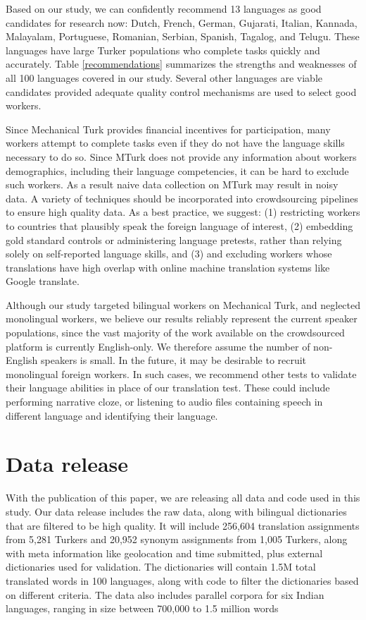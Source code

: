 \documentclass[11pt]{article}
\begin{document}
Based on our study, we can confidently recommend 13 languages as good candidates for research now: Dutch, French, German, Gujarati, Italian, Kannada, Malayalam, Portuguese, Romanian, Serbian, Spanish, Tagalog, and Telugu. These languages have large Turker populations who complete tasks quickly and accurately. Table \ref{recommendations} summarizes the strengths and weaknesses of all 100 languages covered in our study.  Several other languages are viable candidates provided adequate quality control mechanisms are used to select good workers.

Since Mechanical Turk provides financial incentives for participation, many workers attempt to complete tasks even if they do not have the language skills necessary to do so.  Since MTurk does not provide any information about workers demographics, including their language competencies, it can be hard to exclude such workers.  As a result naive data collection on MTurk may result in noisy data.  A variety of techniques should be incorporated into crowdsourcing pipelines to ensure high quality data.  As a best practice, we suggest: (1) restricting workers to countries that plausibly speak the foreign language of interest, (2) embedding gold standard controls or administering language pretests, rather than relying solely on self-reported language skills, and (3) and excluding workers whose translations have high overlap with online machine translation systems like Google translate. 

Although our study targeted bilingual workers on Mechanical Turk, and neglected monolingual workers, we believe our results reliably represent the current speaker populations, since the vast majority of the work available on the crowdsourced platform is currently English-only.  We therefore assume the number of non-English speakers is small.  In the future, it may be desirable to recruit monolingual foreign workers.  In such cases, we recommend other tests to validate their language abilities in place of our translation test.  These could include performing narrative cloze, or listening to audio files containing speech in different language and identifying their language. 



\section{Data release}

With the publication of this paper, we are releasing all data and code used in this study.  Our data release includes the raw data, along with bilingual dictionaries that are filtered to be high quality. It will include 256,604 translation assignments from 5,281 Turkers and 20,952 synonym assignments from 1,005 Turkers, along with meta information like geolocation and time submitted, plus external dictionaries used for validation. The dictionaries will contain 1.5M total translated words in 100 languages, along with code to filter the dictionaries based on different criteria.  The data also includes parallel corpora for six Indian languages, ranging in size between 700,000 to 1.5 million words 

 



\end{document}
